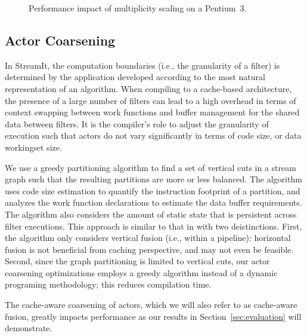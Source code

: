 \begin{figure*}
  \caption{Performance impact of multiplicity scaling on a Pentium~3.}
  \label{fig:90-10}
\end{figure*}

\subsection{Actor Coarsening}

In StreamIt, the computation boundaries (i.e., the granularity of a
filter) is determined by the application developed according to the
most natural representation of an algorithm. When compiling to a
cache-based architecture, the presence of a  large number of filters
can lead to a high overhead in terms of context swapping between work
functions and buffer management for the shared data between filters.
It is the compiler's role to adjust the granularity of execution such
that actors do not vary significantly in terms of code size, or data
workingset size.

We use a greedy partitioning algorithm to find a set of vertical cuts
in a stream graph such that the resulting partitions are more or less
balanced. The algorithm uses code size estimation to quantify the
instruction footprint of a partition, and analyzes the work function
declarations to estimate the data buffer requirements. The algorithm
also considers the amount of static state that is persistent across
filter executions. This approach is similar to that in
\cite{streamit-asplos} with two deistinctions. First, the algorithm
only considers vertical fusion (i.e., within a pipeline): horizontal
fusion is not beneficial from  caching perspective, and may not even
be feasible. Second, since the graph partitioning is limited to
vertical cuts, our actor coarsening optimizations employs a greedy
algorithm instead of a dynamic programing methodology; this reduces
compilation time. 

The cache-aware coarsening of actors, which we will also refer to as
cache-aware fusion, greatly impacts performance as
our results in Section~\ref{sec:evaluation} will demonstrate.